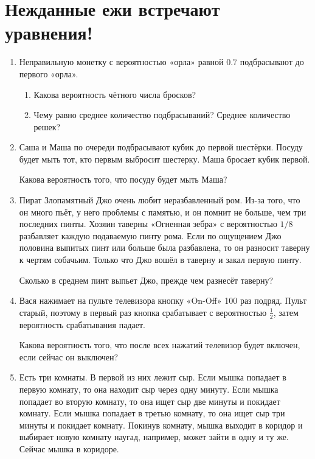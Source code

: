 \documentclass[12pt]{article}
\begin{document}
\section{Нежданные ежи встречают уравнения!}
\begin{enumerate}
    \item  Неправильную монетку с вероятностью «орла» равной $0.7$ подбрасывают до первого «орла».
    \begin{enumerate}
        \item Какова вероятность чётного числа бросков? 
        \item Чему равно среднее количество подбрасываний?  Среднее количество решек? 
    \end{enumerate}
    
    \item Саша и Маша по очереди подбрасывают кубик до первой шестёрки. 
    Посуду будет мыть тот, кто первым выбросит шестерку. 
    Маша бросает кубик первой.
    
    Какова вероятность того, что посуду будет мыть Маша? 
    
    \item Пират Злопамятный Джо очень любит неразбавленный ром. Из-за того,
    что он много пьёт, у него проблемы с памятью, и он помнит не больше, чем три последних
    пинты. Хозяин таверны «Огненная зебра» с вероятностью $1/8$ разбавляет каждую подаваемую пинту рома.
    Если по ощущением Джо половина выпитых пинт или больше была разбавлена, то он
    разносит таверну к чертям собачьим. Только что Джо вошёл в таверну и закал первую пинту.
    
    Сколько в среднем пинт выпьет Джо, прежде чем разнесёт таверну?
    

    \item Вася нажимает на пульте телевизора кнопку «On-Off» 100 раз
    подряд. Пульт старый, поэтому в первый раз кнопка срабатывает с
    вероятностью $\frac{1}{2}$, затем вероятность срабатывания падает.
    
    
    Какова вероятность того, что после всех нажатий телевизор будет
    включен, если сейчас он выключен?
    
    \item Есть три комнаты. В первой из них лежит сыр. Если мышка
    попадает в первую комнату, то она находит сыр через одну минуту.
    Если мышка попадает во вторую комнату, то она ищет сыр две минуты
    и покидает комнату. Если мышка попадает в третью комнату, то она
    ищет сыр три минуты и покидает комнату. Покинув комнату, мышка
    выходит в коридор и выбирает новую комнату наугад, например, может
    зайти в одну и ту же. Сейчас мышка в коридоре. 
    

\end{enumerate}
\end{document}
